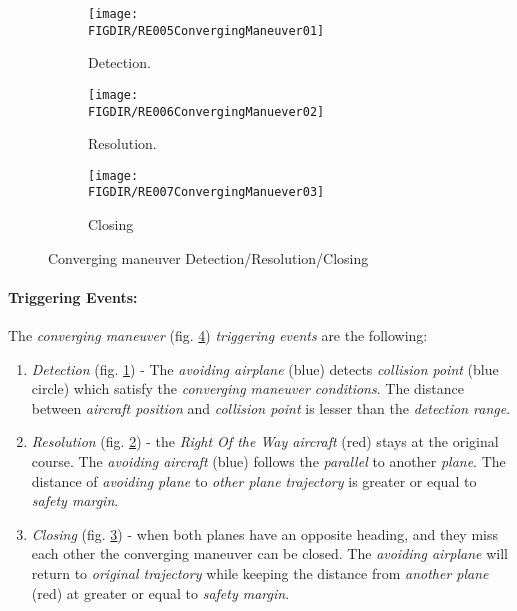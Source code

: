 \begin{figure}[H]
	\centering
    \begin{subfigure}{0.32\textwidth}
    	\centering
        \texttt{[image: \\FIGDIR/RE005ConvergingManeuver01]} 
        \caption{Detection.}
        \label{fig:ConvergingManeuverTheoreticalDetection}
    \end{subfigure}
    \begin{subfigure}{0.32\textwidth}
        \centering
        \texttt{[image: \\FIGDIR/RE006ConvergingManuever02]} 
        \caption{Resolution.}
        \label{fig:ConvergingManeuverTheoreticalResolution}
    \end{subfigure}
    \begin{subfigure}{0.32\textwidth}
        \centering
        \texttt{[image: \\FIGDIR/RE007ConvergingManuever03]} 
        \caption{Closing}
        \label{fig:ConvergingManeuverTheoreticalClosure}
    \end{subfigure}
    \caption{Converging maneuver Detection/Resolution/Closing}
    \label{fig:ConvergingManeuverTheoretical}
\end{figure}

\paragraph{Triggering Events:} The \emph{converging maneuver} (fig. \ref{fig:ConvergingManeuverTheoretical}) \emph{triggering events} are the following:

\begin{enumerate}
    \item \emph{Detection} (fig. \ref{fig:ConvergingManeuverTheoreticalDetection}) -  The \emph{avoiding airplane} (blue) detects \emph{collision point} (blue circle) which satisfy the \emph{converging maneuver conditions}. The distance between \emph{aircraft position} and \emph{collision point} is lesser than the \emph{detection range}.
    
    \item \emph{Resolution} (fig. \ref{fig:ConvergingManeuverTheoreticalResolution}) - the \emph{Right Of the Way aircraft} (red) stays at the original course. The \emph{avoiding aircraft} (blue) follows the \emph{parallel} to another \emph{plane}. The distance of \emph{avoiding plane} to \emph{other plane trajectory} is greater or equal to \emph{safety margin}.
    
    \item \emph{Closing} (fig. \ref{fig:ConvergingManeuverTheoreticalClosure}) - when both planes have an opposite heading, and they miss each other the converging maneuver can be closed. The \emph{avoiding airplane} will return to \emph{original trajectory}  while keeping the distance from \emph{another plane} (red) at greater or equal to \emph{safety margin}.
\end{enumerate}


